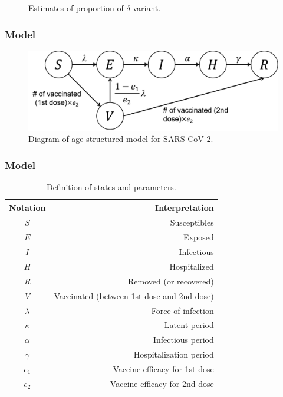 \documentclass[aspectratio=169, 9pt, xcolor=dvipsnames]{beamer}
\begin{document}
\begin{frame}
\begin{minipage}{0.6\textwidth}
\begin{figure}
	    		\caption{Estimates of proportion of $\delta$ variant.}
	    	\end{figure}
	    \end{minipage}
	\end{frame}

	\begin{frame}\frametitle{Model}
	    \begin{figure}
	    	\centering
	    	\includegraphics[width=12cm]{diagram.png}
	    	\caption{Diagram of age-structured model for SARS-CoV-2.}
	    \end{figure}
	\end{frame}

	\begin{frame}\frametitle{Model}
	    \begin{table}
	    	\begin{tabular}{cr}
	    		\toprule
	    		\textbf{Notation} & \textbf{Interpretation} \\
	    		\midrule
	    		$S$ & Susceptibles \\
	    		$E$ & Exposed \\
	    		$I$ & Infectious \\
	    		$H$ & Hospitalized \\
	    		$R$ & Removed (or recovered) \\
	    		$V$ & Vaccinated (between 1st dose and 2nd dose) \\
	    		$\lambda$ & Force of infection \\
	    		$\kappa$ & Latent period \\
	    		$\alpha$ & Infectious period \\
	    		$\gamma$ & Hospitalization period \\
	    		$e_1$ & Vaccine efficacy for 1st dose \\
	    		$e_2$ & Vaccine efficacy for 2nd dose \\
	    		\bottomrule
	    	\end{tabular}
	    	\caption{Definition of states and parameters.}
	    \end{table}
	\end{frame}
\end{document}
